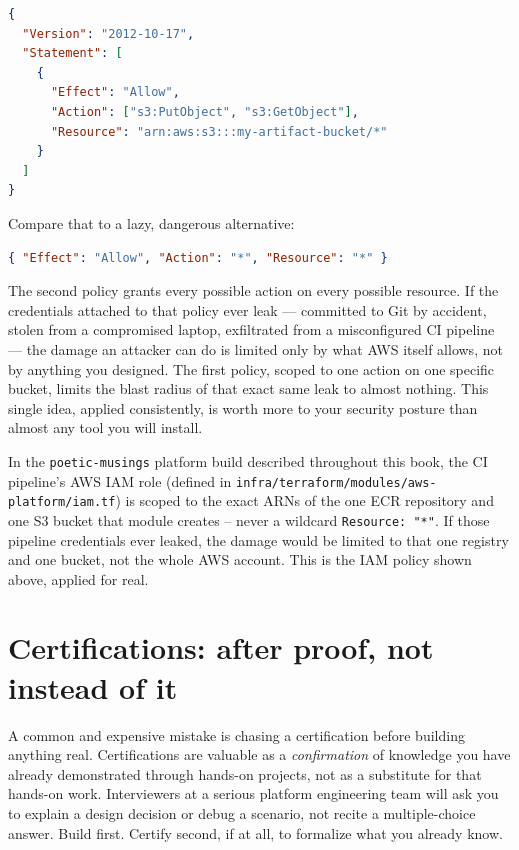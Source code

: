 \documentclass[11pt,twoside,openright]{book}
\begin{document}
\begin{lstlisting}[language=json]
{
  "Version": "2012-10-17",
  "Statement": [
    {
      "Effect": "Allow",
      "Action": ["s3:PutObject", "s3:GetObject"],
      "Resource": "arn:aws:s3:::my-artifact-bucket/*"
    }
  ]
}
\end{lstlisting}

Compare that to a lazy, dangerous alternative:

\begin{lstlisting}[language=json]
{ "Effect": "Allow", "Action": "*", "Resource": "*" }
\end{lstlisting}

The second policy grants every possible action on every possible resource. If the
credentials attached to that policy ever leak --- committed to Git by accident, stolen from
a compromised laptop, exfiltrated from a misconfigured CI pipeline --- the damage an
attacker can do is limited only by what AWS itself allows, not by anything you designed.
The first policy, scoped to one action on one specific bucket, limits the blast radius of
that exact same leak to almost nothing. This single idea, applied consistently, is worth
more to your security posture than almost any tool you will install.

\begin{caseStudy}
In the \texttt{poetic-musings} platform build described throughout this book, the CI
pipeline's AWS IAM role (defined in \texttt{infra/terraform/modules/aws-platform/iam.tf})
is scoped to the exact ARNs of the one ECR repository and one S3 bucket that module
creates -- never a wildcard \texttt{Resource: "*"}. If those pipeline credentials ever
leaked, the damage would be limited to that one registry and one bucket, not the whole
AWS account. This is the IAM policy shown above, applied for real.
\end{caseStudy}

\section{Certifications: after proof, not instead of it}

A common and expensive mistake is chasing a certification before building anything real.
Certifications are valuable as a \emph{confirmation} of knowledge you have already
demonstrated through hands-on projects, not as a substitute for that hands-on work.
Interviewers at a serious platform engineering team will ask you to explain a design
decision or debug a scenario, not recite a multiple-choice answer. Build first. Certify
second, if at all, to formalize what you already know.
\end{document}
